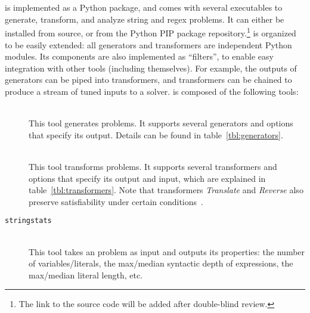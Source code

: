 \section{\fuzzer{}}
\label{sec:fuzzer}

\fuzzer{} is implemented as a Python package, and comes with several
executables to generate, transform, and analyze \smtfull{} string and regex
problems. It can either be installed from source, or from the Python
PIP package repository.\footnote{The link to the
source code will be added after double-blind review.}
\fuzzer{} is organized to be easily extended:
all generators and transformers are independent Python modules. Its
components are also implemented as \unix{} ``filters'', to enable easy
integration with other tools (including themselves). For example, the
outputs of generators can be piped into transformers, and transformers
can be chained to produce a stream of tuned inputs to a
solver. \fuzzer{} is composed of the following tools:
\begin{description}
    \item[\generator{}] \hfill \\
        This tool generates \smt{} problems. It supports several generators and
        options that specify its output. Details can be found in
        table~\ref{tbl:generators}.
    \item[\transformer{}] \hfill \\
        This tool transforms \smt{}
        problems. It supports several transformers and options that specify
        its output and input, which are explained in
        table~\ref{tbl:transformers}. Note that transformers
        \textit{Translate} and \textit{Reverse} also preserve
        satisfiability under certain conditions~\cite{ifaz}.
    \item[\texttt{stringstats}] \hfill \\
        This tool takes an \smt{}
        problem as input and outputs its properties: the number of
        variables/literals, the max/median syntactic depth of expressions, the
        max/median literal length, etc.
\end{description}

